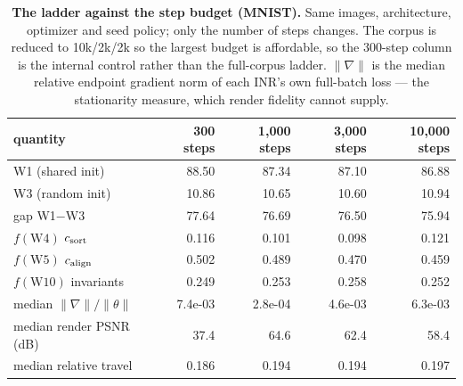 \begin{table}[t]
\centering\small
\caption{\textbf{The ladder against the step budget (MNIST).} Same images, architecture, optimizer and seed policy; only the number of steps changes. The corpus is reduced to 10k/2k/2k so the largest budget is affordable, so the 300-step column is the internal control rather than the full-corpus ladder. $\|\nabla\|$ is the median relative endpoint gradient norm of each INR's own full-batch loss --- the stationarity measure, which render fidelity cannot supply.}
\label{tab:sweep}
\begin{tabular}{@{}lrrrr@{}}
\toprule
quantity & 300 steps & 1,000 steps & 3,000 steps & 10,000 steps \\
\midrule
W1 (shared init) & 88.50 & 87.34 & 87.10 & 86.88 \\
W3 (random init) & 10.86 & 10.65 & 10.60 & 10.94 \\
gap W1$-$W3 & 77.64 & 76.69 & 76.50 & 75.94 \\
\midrule
$f(\mathrm{W4})$ $c_{\mathrm{sort}}$ & 0.116 & 0.101 & 0.098 & 0.121 \\
$f(\mathrm{W5})$ $c_{\mathrm{align}}$ & 0.502 & 0.489 & 0.470 & 0.459 \\
$f(\mathrm{W10})$ invariants & 0.249 & 0.253 & 0.258 & 0.252 \\
\midrule
median $\|\nabla\|/\|\theta\|$ & 7.4e-03 & 2.8e-04 & 4.6e-03 & 6.3e-03 \\
median render PSNR (dB) & 37.4 & 64.6 & 62.4 & 58.4 \\
median relative travel & 0.186 & 0.194 & 0.194 & 0.197 \\
\bottomrule
\end{tabular}
\end{table}
